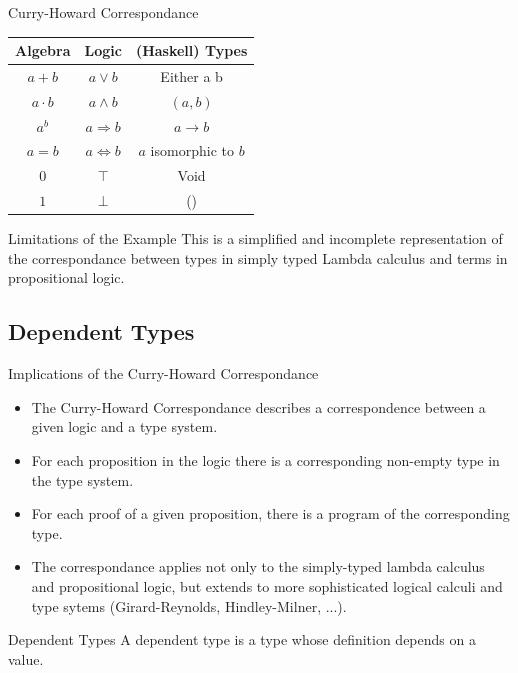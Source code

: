 \documentclass[
	aspectratio=169, %
	8pt, %
]{beamer}
\begin{document}
\begin{frame}{\insertsubsection}
		\begin{definition}{Curry-Howard Correspondance}
				\centering
				\begin{tabular}{|c|c|c|}
					\hline
								Algebra & Logic & (Haskell) Types \\
					\hline
					$a + b$     & $a \lor b$  & Either a b \\
					$a \cdot b$ & $a \land b$ & $(a,b)$ \\
					$a^b$ & $a \Rightarrow b$ & $a \rightarrow b$ \\
					$a=b$ & $a \Leftrightarrow b$ & $a$ isomorphic to $b$ \\
					$0$ & $ \top $ & Void \\
					$1$ & $ \perp $ & () \\
					\hline
				\end{tabular}
		\end{definition}
	
		\pause

		\begin{note}{Limitations of the Example}
		This is a simplified and incomplete representation of the correspondance between types in simply typed Lambda calculus and terms in propositional logic.
		\end{note}
\end{frame}


\subsection{Dependent Types}
\begin{frame}{\insertsubsection}
		\begin{note}{Implications of the Curry-Howard Correspondance}
						\begin{itemize}
								\item{The Curry-Howard Correspondance describes a correspondence between a given logic and a type system. }
								\item{For each proposition in the logic there is a corresponding non-empty type in the type system.}
								\item{For each proof of a given proposition, there is a program of the corresponding type.}
								\item{The correspondance applies not only to the simply-typed lambda calculus and propositional logic, but extends to more sophisticated logical calculi and type sytems (Girard-Reynolds, Hindley-Milner, ...).}
						\end{itemize}
		\end{note}
		\begin{definition}{Dependent Types}
						A dependent type is a type whose definition depends on a value.
		\end{definition}
\end{frame}
\end{document}
